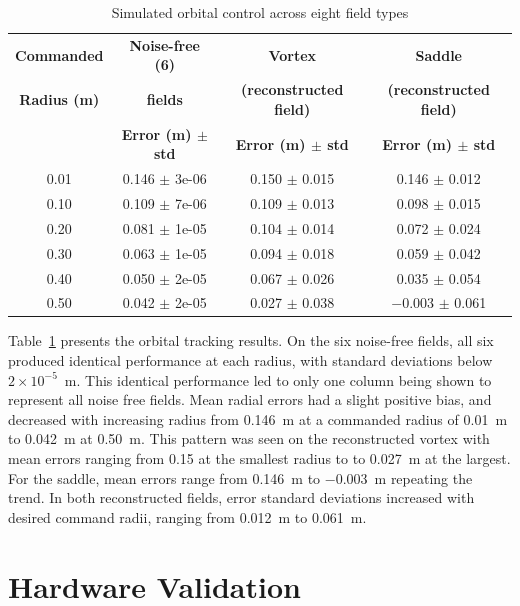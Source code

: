 \documentclass[lettersize,journal]{IEEEtran}
\begin{document}
\begin{table}[!t]
    \centering
    \caption{Simulated orbital control across eight field types}
    \label{tab:simulation_orbital_results}
    \footnotesize
    \setlength{\tabcolsep}{3pt}
    \begin{tabular}{cccc}
    \hline
    \textbf{Commanded} & \textbf{Noise-free (6)} & \textbf{Vortex} & \textbf{Saddle} \\
    \textbf{Radius (m)} & \textbf{fields} & \textbf{(reconstructed field)} & \textbf{(reconstructed field)} \\
     & \textbf{Error (m) $\pm$ std} & \textbf{Error (m) $\pm$ std} & \textbf{Error (m) $\pm$ std} \\
    \hline
    0.01 & 0.146 $\pm$ 3e-06 & 0.150 $\pm$ 0.015 & 0.146 $\pm$ 0.012 \\
    0.10 & 0.109 $\pm$ 7e-06 & 0.109 $\pm$ 0.013 & 0.098 $\pm$ 0.015 \\
    0.20 & 0.081 $\pm$ 1e-05 & 0.104 $\pm$ 0.014 & 0.072 $\pm$ 0.024 \\
    0.30 & 0.063 $\pm$ 1e-05 & 0.094 $\pm$ 0.018 & 0.059 $\pm$ 0.042 \\
    0.40 & 0.050 $\pm$ 2e-05 & 0.067 $\pm$ 0.026 & 0.035 $\pm$ 0.054 \\
    0.50 & 0.042 $\pm$ 2e-05 & 0.027 $\pm$ 0.038 & $-$0.003 $\pm$ 0.061 \\

    \hline
    \end{tabular}
    \end{table}


    Table~\ref{tab:simulation_orbital_results} presents the orbital tracking results. On the six noise-free fields, all six produced identical
    performance at each radius, with standard deviations below $2 \times 10^{-5}$~m. This identical performance led to only one column being shown to represent all noise free fields. Mean radial errors had a slight positive bias, and decreased with increasing radius from 0.146~m at a commanded radius of 0.01~m to 0.042~m at 0.50~m. This pattern was seen on the reconstructed vortex with mean errors ranging from 0.15 at the smallest radius to to 0.027~m at the largest. For the saddle, mean errors range from 0.146~m to $-0.003$~m repeating the trend. In both reconstructed fields, error standard deviations increased with desired command radii, ranging from 0.012~m to 0.061~m.    


\section{Hardware Validation}
\end{document}

